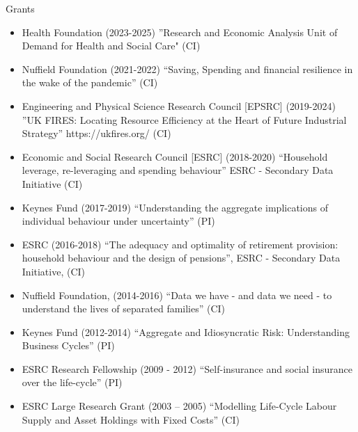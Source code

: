 \documentclass{resume} %
\begin{document}
\begin{rSection}{Grants}

\begin{itemize}
\item Health Foundation (2023-2025) ''Research and Economic Analysis Unit of Demand for Health and Social Care" (CI) 
\item Nuffield Foundation (2021-2022) ``Saving, Spending and financial resilience in the wake of the pandemic'' (CI) 
\item Engineering and Physical Science Research Council [EPSRC] (2019-2024) ''UK FIRES: Locating Resource Efficiency at the Heart of Future Industrial Strategy'' https://ukfires.org/ (CI) 
\item Economic and Social Research Council [ESRC] (2018-2020) “Household leverage, re-leveraging and spending behaviour” ESRC - Secondary Data Initiative (CI)
\item Keynes Fund (2017-2019) “Understanding the aggregate implications of individual behaviour under uncertainty” (PI)
\item ESRC (2016-2018) “The adequacy and optimality of retirement provision: household behaviour and the design of pensions”, ESRC - Secondary Data Initiative, (CI)
\item Nuffield Foundation, (2014-2016)  “Data we have - and data we need - to understand the lives of separated families” (CI) 
\item Keynes Fund (2012-2014) “Aggregate and Idiosyncratic Risk: Understanding Business Cycles” (PI)
\item ESRC Research Fellowship (2009 - 2012) “Self-insurance and social insurance over the life-cycle” (PI)
\item ESRC Large Research Grant (2003 -- 2005) “Modelling Life-Cycle Labour Supply and Asset Holdings with Fixed Costs” (CI)
\end{itemize}
\end{rSection}
\end{document}

